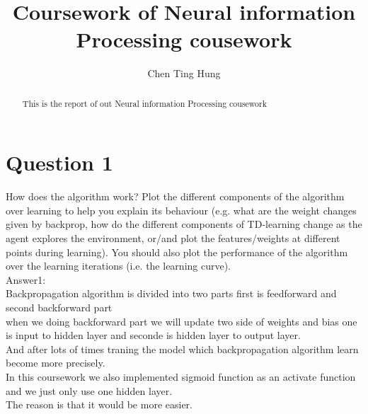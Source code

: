 \documentclass[12pt]{article}
\begin{document}
\title{Coursework of Neural information Processing cousework}



\author{Chen Ting Hung} {}
	
\maketitle

\begin{abstract}
This is the report of out Neural information Processing cousework
\end{abstract}

\section{Question 1}
How does the algorithm work? Plot the different components of the algorithm over learning to help you explain its behaviour (e.g. what are the weight changes given by backprop, how do the different components of TD-learning change as the agent explores the environment, or/and plot the features/weights at different points during learning). You should also plot the performance of the algorithm over the learning iterations (i.e. the learning curve).\\

Answer1:\\
Backpropagation algorithm is divided into two parts first is feedforward and second backforward part \\
when we doing backforward part we will update two side of weights and bias one is input to hidden layer and seconde is hidden layer to output layer.\\
And after lots of times traning the model which backpropagation algorithm learn become more precisely.\\
In this coursework we also implemented sigmoid function as an activate function and we just only use one hidden layer.\\
The reason is that it would be more easier.
\end{document}

